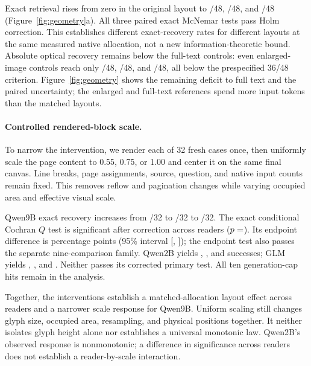 \documentclass{article}
\begin{document}
Exact retrieval rises from zero in the original layout to /48, /48, and /48 (Figure~\ref{fig:geometry}a). All three paired exact McNemar tests pass Holm correction. This establishes different exact-recovery rates for different layouts at the same measured native allocation, not a new information-theoretic bound. Absolute optical recovery remains below the full-text controls: even enlarged-image controls reach only /48, /48, and /48, all below the prespecified 36/48 criterion. Figure~\ref{fig:geometry} shows the remaining deficit to full text and the paired uncertainty; the enlarged and full-text references spend more input tokens than the matched layouts.

\paragraph{Controlled rendered-block scale.}
To narrow the intervention, we render each of 32 fresh cases once, then uniformly scale the page content to 0.55, 0.75, or 1.00 and center it on the same final canvas. Line breaks, page assignments, source, question, and native input counts remain fixed. This removes reflow and pagination changes while varying occupied area and effective visual scale.

Qwen9B exact recovery increases from /32 to /32 to /32. The exact conditional Cochran $Q$ test is significant after correction across readers ($p=\nval{scale.Qwen9B.holm}$). Its endpoint difference is  percentage points (95\% interval [, ]); the endpoint test also passes the separate nine-comparison family. Qwen2B yields , , and  successes; GLM yields , , and . Neither passes its corrected primary test. All ten generation-cap hits remain in the analysis.

Together, the interventions establish a matched-allocation layout effect across readers and a narrower scale response for Qwen9B. Uniform scaling still changes glyph size, occupied area, resampling, and physical positions together. It neither isolates glyph height alone nor establishes a universal monotonic law. Qwen2B's observed response is nonmonotonic; a difference in significance across readers does not establish a reader-by-scale interaction.
\end{document}
